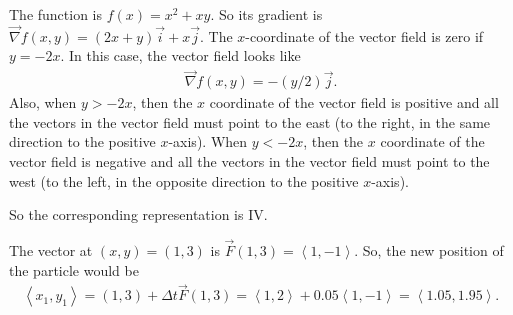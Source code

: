 	\spc

	The function is $f(x) = x^2 + xy$. So its gradient is $\vec{\nabla} f (x, y) = (2x + y) \vec{i} + x \vec{j}$. The $x$-coordinate of the vector field is zero if $y = -2x$. In this case, the vector field looks like
		\begin{align*}
		\vec{\nabla}f (x, y) = -(y/2) \vec{j} .
		\end{align*}
	Also, when $y > -2x$, then the $x$ coordinate of the vector field is positive and all the vectors in the vector field must point to the east (to the right, in the same direction to the positive $x$-axis). When $y < -2x$, then the $x$ coordinate of the vector field is negative and all the vectors in the vector field must point to the west (to the left, in the opposite direction to the positive $x$-axis).
	
	So the corresponding representation is IV.

	\spc
	
	The vector at $(x, y) = (1, 3)$ is $\vec{F}(1, 3) = \left\langle 1, -1 \right\rangle$. So, the new position of the particle would be 	
	\begin{align*}
	\left\langle x_1 , y_1 \right\rangle = (1, 3) + \Delta t \vec{F} (1, 3) = \left\langle 1, 2 \right\rangle + 0.05 \left\langle 1 , -1 \right\rangle = \left\langle 1.05 , 1.95 \right\rangle .
	\end{align*}



